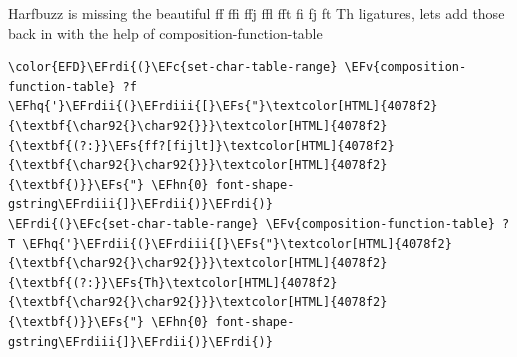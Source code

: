 \documentclass{scrartcl}
\newcommand{\EFs}[1]{\textcolor{EFs}{#1}} %
\newcommand{\EFc}[1]{\textcolor{EFc}{#1}} %
\newcommand{\EFv}[1]{\textcolor{EFv}{#1}} %
\newcommand{\EFhn}[1]{\textcolor{EFhn}{\textbf{#1}}} %
\newcommand{\EFhq}[1]{\textcolor{EFhq}{#1}} %
\newcommand{\EFrdi}[1]{\textcolor{EFrdi}{#1}} %
\newcommand{\EFrdii}[1]{\textcolor{EFrdii}{#1}} %
\newcommand{\EFrdiii}[1]{\textcolor{EFrdiii}{#1}} %
\begin{document}
Harfbuzz is missing the beautiful ff ffi ffj ffl fft fi fj ft Th ligatures,
lets add those back in with the help of composition-function-table

\begin{Code}
\begin{Verbatim}[]
\color{EFD}\EFrdi{(}\EFc{set-char-table-range} \EFv{composition-function-table} ?f \EFhq{'}\EFrdii{(}\EFrdiii{[}\EFs{"}\textcolor[HTML]{4078f2}{\textbf{\char92{}\char92{}}}\textcolor[HTML]{4078f2}{\textbf{(?:}}\EFs{ff?[fijlt]}\textcolor[HTML]{4078f2}{\textbf{\char92{}\char92{}}}\textcolor[HTML]{4078f2}{\textbf{)}}\EFs{"} \EFhn{0} font-shape-gstring\EFrdiii{]}\EFrdii{)}\EFrdi{)}
\EFrdi{(}\EFc{set-char-table-range} \EFv{composition-function-table} ?T \EFhq{'}\EFrdii{(}\EFrdiii{[}\EFs{"}\textcolor[HTML]{4078f2}{\textbf{\char92{}\char92{}}}\textcolor[HTML]{4078f2}{\textbf{(?:}}\EFs{Th}\textcolor[HTML]{4078f2}{\textbf{\char92{}\char92{}}}\textcolor[HTML]{4078f2}{\textbf{)}}\EFs{"} \EFhn{0} font-shape-gstring\EFrdiii{]}\EFrdii{)}\EFrdi{)}
\end{Verbatim}
\end{Code}
\end{document}
